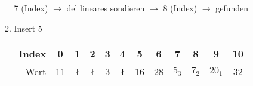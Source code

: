 \documentclass{bschlangaul-aufgabe}
\begin{document}
\begin{enumerate}
\begin{enumerate}
\begin{bAntwort}
7 (Index) $\rightarrow$
del lineares sondieren $\rightarrow$
8 (Index) $\rightarrow$ gefunden
\end{bAntwort}


\item Insert 5

\begin{bAntwort}
\begin{tabular}{|r||c|c|c|c|c|c|c|c|c|c|c|}
Index & 0  & 1  & 2  & 3 & 4  & 5  & 6  & 7     & 8     & 9      & 10 \\\hline
Wert  & 11 & \l & \l & 3 & \l & 16 & 28 & $5_3$ & $7_2$ & $20_1$ & 32 \\
\end{tabular}
\end{bAntwort}
\end{enumerate}

\end{enumerate}
\end{document}
